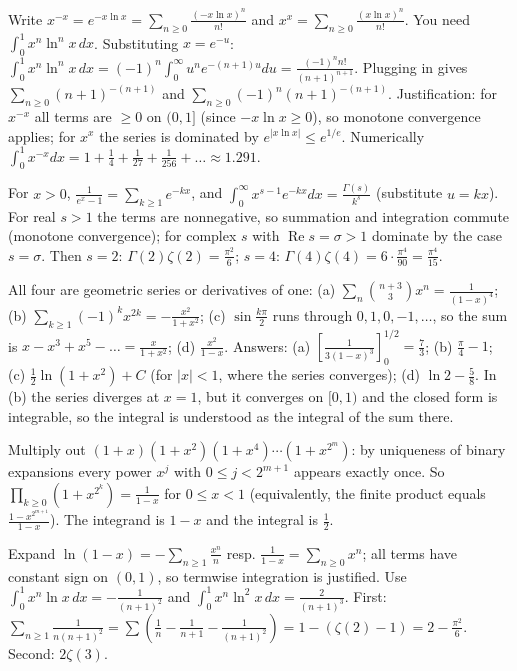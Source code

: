\documentclass[11pt,a4paper]{article}
\begin{document}

Write \(x^{-x}=e^{-x\ln x}=\sum_{n\ge0}\frac{(-x\ln x)^n}{n!}\) and \(x^x=\sum_{n\ge0}\frac{(x\ln x)^n}{n!}\). You need \(\int_0^1x^n\ln^nx\,dx\).
Substituting \(x=e^{-u}\): \(\int_0^1x^n\ln^nx\,dx=(-1)^n\int_0^\infty u^ne^{-(n+1)u}du=\frac{(-1)^nn!}{(n+1)^{n+1}}\). Plugging in gives \(\sum_{n\ge0}(n+1)^{-(n+1)}\) and \(\sum_{n\ge0}(-1)^n(n+1)^{-(n+1)}\).
Justification: for \(x^{-x}\) all terms are \(\ge0\) on \((0,1]\) (since \(-x\ln x\ge0\)), so monotone convergence applies; for \(x^x\) the series is dominated by \(e^{\lvert x\ln x\rvert}\le e^{1/e}\). Numerically \(\int_0^1x^{-x}dx=1+\frac14+\frac1{27}+\frac1{256}+\dots\approx1.291\).

For \(x\gt0\), \(\frac1{e^x-1}=\sum_{k\ge1}e^{-kx}\), and \(\int_0^\infty x^{s-1}e^{-kx}dx=\frac{\Gamma(s)}{k^s}\) (substitute \(u=kx\)).
For real \(s\gt1\) the terms are nonnegative, so summation and integration commute (monotone convergence); for complex \(s\) with \(\operatorname{Re}s=\sigma\gt1\) dominate by the case \(s=\sigma\). Then \(s=2\): \(\Gamma(2)\zeta(2)=\frac{\pi^2}6\); \(s=4\): \(\Gamma(4)\zeta(4)=6\cdot\frac{\pi^4}{90}=\frac{\pi^4}{15}\).

All four are geometric series or derivatives of one: (a) \(\sum_n\binom{n+3}{3}x^n=\frac1{(1-x)^4}\); (b) \(\sum_{k\ge1}(-1)^kx^{2k}=-\frac{x^2}{1+x^2}\); (c) \(\sin\frac{k\pi}2\) runs through \(0,1,0,-1,\dots\), so the sum is \(x-x^3+x^5-\dots=\frac{x}{1+x^2}\); (d) \(\frac{x^2}{1-x}\).
Answers: (a) \(\left[\frac1{3(1-x)^3}\right]_0^{1/2}=\frac73\); (b) \(\frac\pi4-1\); (c) \(\frac12\ln(1+x^2)+C\) (for \(\lvert x\rvert\lt1\), where the series converges); (d) \(\ln2-\frac58\). In (b) the series diverges at \(x=1\), but it converges on \([0,1)\) and the closed form is integrable, so the integral is understood as the integral of the sum there.

Multiply out \((1+x)(1+x^2)(1+x^4)\cdots(1+x^{2^{m}})\): by uniqueness of binary expansions every power \(x^j\) with \(0\le j\lt 2^{m+1}\) appears exactly once.
So \(\prod_{k\ge0}(1+x^{2^k})=\frac1{1-x}\) for \(0\le x\lt1\) (equivalently, the finite product equals \(\frac{1-x^{2^{m+1}}}{1-x}\)). The integrand is \(1-x\) and the integral is \(\frac12\).

Expand \(\ln(1-x)=-\sum_{n\ge1}\frac{x^n}n\) resp. \(\frac1{1-x}=\sum_{n\ge0}x^n\); all terms have constant sign on \((0,1)\), so termwise integration is justified. Use \(\int_0^1x^n\ln x\,dx=-\frac1{(n+1)^2}\) and \(\int_0^1x^n\ln^2x\,dx=\frac2{(n+1)^3}\).
First: \(\sum_{n\ge1}\frac1{n(n+1)^2}=\sum\left(\frac1n-\frac1{n+1}-\frac1{(n+1)^2}\right)=1-(\zeta(2)-1)=2-\frac{\pi^2}6\). Second: \(2\zeta(3)\).
\end{document}

